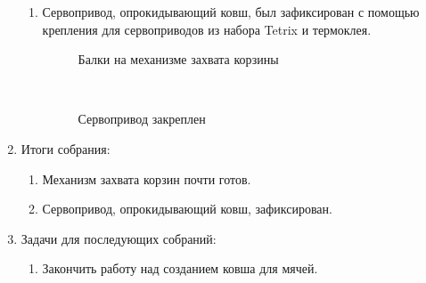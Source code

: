 \begin{enumerate}
\begin{enumerate}
		\item Сервопривод, опрокидывающий ковш, был зафиксирован с помощью крепления для сервоприводов из набора Tetrix и термоклея.
	    \begin{figure}[H]
			\begin{minipage}[h]{0.47\linewidth}
				\caption{Балки на механизме захвата корзины}  
			\end{minipage}
			\hfill
			\begin{minipage}[h]{0.47\linewidth}
				\caption{Сервопривод закреплен}
			\end{minipage}
		\end{figure}
		
	\end{enumerate}
	
	\item Итоги собрания:
	\begin{enumerate}
		\item Механизм захвата корзин почти готов.
		
		\item Сервопривод, опрокидывающий ковш, зафиксирован.
		
	\end{enumerate}
	
	\item Задачи для последующих собраний:
	\begin{enumerate}
		\item Закончить работу над созданием ковша для мячей.
		
	\end{enumerate}     
\end{enumerate}
\fillpage

